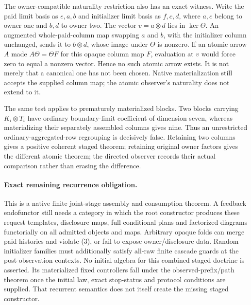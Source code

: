 \documentclass[11pt]{article}
\begin{document}
The owner-compatible naturality restriction also has an exact witness. Write the paid limit basis as $e,a,b$ and initializer limit basis as $f,c,d$, where $a,c$ belong to owner one and $b,d$ to owner two. The vector $v=a\otimes d$ lies in $\ker\Theta$. An augmented whole-paid-column map swapping $a$ and $b$, with the initializer column unchanged, sends it to $b\otimes d$, whose image under $\Theta$ is nonzero. If an atomic arrow $A$ made $A\Theta=\Theta F$ for this opaque column map $F$, evaluation at $v$ would force zero to equal a nonzero vector. Hence no such atomic arrow exists. It is not merely that a canonical one has not been chosen. Native materialization still accepts the supplied column map; the atomic observer's naturality does not extend to it.

The same test applies to prematurely materialized blocks. Two blocks carrying $K_i\otimes T_i$ have ordinary boundary-limit coefficient of dimension seven, whereas materializing their separately assembled columns gives nine. Thus an unrestricted ordinary-aggregated-row regrouping is decisively false. Retaining two columns gives a positive coherent staged theorem; retaining original owner factors gives the different atomic theorem; the directed observer records their actual comparison rather than erasing the difference.

\paragraph{Exact remaining recurrence obligation.}
This is a native finite joint-stage assembly and consumption theorem. A feedback endofunctor still needs a category in which the root constructor produces these request templates, disclosure maps, full conditional plans and factorized diagrams functorially on all admitted objects and maps. Arbitrary opaque folds can merge paid histories and violate (3), or fail to expose owner/disclosure data. Random initializer families must additionally satisfy all-raw finite cascade guards at the post-observation contexts. No initial algebra for this combined staged doctrine is asserted. Its materialized fixed controllers fall under the observed-prefix/path theorem once the initial law, exact stop-status and protocol conditions are supplied. That recurrent semantics does not itself create the missing staged constructor.
\end{document}
